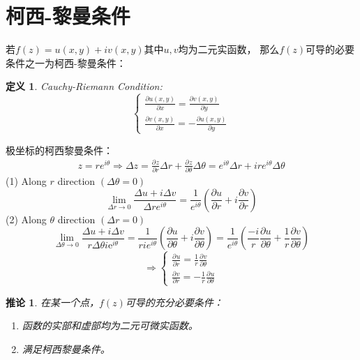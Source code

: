 \documentclass[10pt, a4paper, oneside]{ctexbook}
\newtheorem{definition}[theorem]{定义}
\newtheorem{corollary}[theorem]{推论}
\def\de{\ensuremath{\Delta}}
\newcommand{\partdev}[3][]
{\ensuremath{\frac{\displaystyle \partial^{#1} #2}{ \displaystyle \partial #3}}}
\begin{document}
\section{柯西-黎曼条件}
若$f(z)=u(x,y)+iv(x,y)$其中$u,v$均为二元实函数，
那么$f(z)$可导的必要条件之一为柯西-黎曼条件：
\begin{definition}{\rm Cauchy-Riemann Condition}:
    $$
    \left\{
    \begin{aligned}
        \frac{\displaystyle \partial u(x,y)}{ \displaystyle \partial x}=\frac{\displaystyle \partial v(x,y)}{\displaystyle \partial y}\\
        \frac{\displaystyle \partial v(x,y)}{ \displaystyle \partial x}=-\frac{\displaystyle \partial u(x,y)}{\displaystyle \partial y} 
    \end{aligned}     
    \right.
    $$
\end{definition}
极坐标的柯西黎曼条件：
\begin{align*}
    z=re^{i\theta}\Rightarrow \de z = \partdev{z}{r} \de r+ \partdev{z}{\theta} \de \theta =e^{i\theta}\de r + ire^{i\theta}\de \theta
\end{align*}
(1) Along $r$ direction $(\Delta \theta=0)$
\begin{equation*}
\lim _{\Delta r \rightarrow 0} \frac{\Delta u+i \Delta v}{\Delta r e^{i \theta}}=\frac{1}{e^{i \theta}}\left(\frac{\partial u}{\partial r}+i \frac{\partial v}{\partial r}\right)
\end{equation*}
(2) Along $\theta$ direction $(\Delta r=0)$
\begin{equation*}
\lim _{\Delta \theta \rightarrow 0} \frac{\Delta u+i \Delta v}{r \Delta \theta i \mathrm{e}^{i \theta}}=\frac{1}{r i e^{i \theta}}\left(\frac{\partial u}{\partial \theta}+i \frac{\partial v}{\partial \theta}\right)=\frac{1}{e^{i \theta}}\left(\frac{-i}{r} \frac{\partial u}{\partial \theta}+\frac{1}{r} \frac{\partial v}{\partial \theta}\right)
\end{equation*}
\begin{equation*}
    \Rightarrow \begin{cases} \displaystyle
        \partdev{u}{r}=\frac{1}{r} \partdev{v}{\theta}\\
       \displaystyle \partdev{v}{r}=-\frac{1}{r} \partdev{u}{\theta}
    \end{cases}
\end{equation*}
\begin{corollary}
    在某一个点，$f(z)$可导的充分必要条件：
    \begin{enumerate}
        \item 函数的实部和虚部均为二元可微实函数。
        \item 满足柯西黎曼条件。
    \end{enumerate}
\end{corollary}
\end{document}
